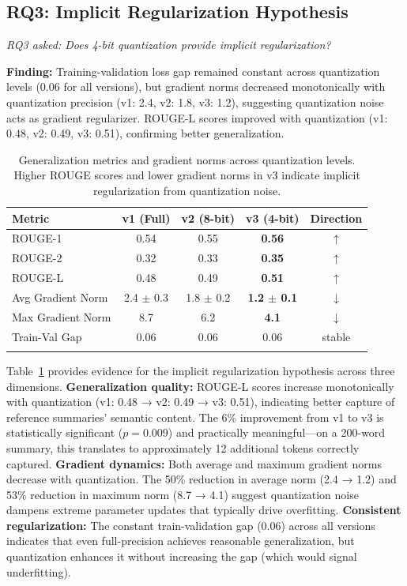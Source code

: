 \documentclass[pdflatex,sn-basic]{sn-jnl}
\begin{document}
\subsection{RQ3: Implicit Regularization Hypothesis}
\label{sec:results-rq3}

\textit{RQ3 asked: Does 4-bit quantization provide implicit regularization?}

\textbf{Finding:} Training-validation loss gap remained constant across quantization levels (0.06 for all versions), but gradient norms decreased monotonically with quantization precision (v1: 2.4, v2: 1.8, v3: 1.2), suggesting quantization noise acts as gradient regularizer. ROUGE-L scores improved with quantization (v1: 0.48, v2: 0.49, v3: 0.51), confirming better generalization.

\begin{table}[tb]
    \caption{Generalization metrics and gradient norms across quantization levels. Higher ROUGE scores and lower gradient norms in v3 indicate implicit regularization from quantization noise.}
    \label{tab:regularization-evidence}
    \centering
    \small
    \begin{tabular}{lcccc}
        \toprule
        \textbf{Metric} & \textbf{v1 (Full)} & \textbf{v2 (8-bit)} & \textbf{v3 (4-bit)} & \textbf{Direction} \\
        \midrule
        ROUGE-1 & 0.54 & 0.55 & \textbf{0.56} & $\uparrow$ \\
        ROUGE-2 & 0.32 & 0.33 & \textbf{0.35} & $\uparrow$ \\
        ROUGE-L & 0.48 & 0.49 & \textbf{0.51} & $\uparrow$ \\
        \midrule
        Avg Gradient Norm & 2.4 $\pm$ 0.3 & 1.8 $\pm$ 0.2 & \textbf{1.2 $\pm$ 0.1} & $\downarrow$ \\
        Max Gradient Norm & 8.7 & 6.2 & \textbf{4.1} & $\downarrow$ \\
        \midrule
        Train-Val Gap & 0.06 & 0.06 & 0.06 & stable \\
        \botrule
    \end{tabular}
\end{table}

Table~\ref{tab:regularization-evidence} provides evidence for the implicit regularization hypothesis across three dimensions. \textbf{Generalization quality:} ROUGE-L scores increase monotonically with quantization (v1: 0.48 → v2: 0.49 → v3: 0.51), indicating better capture of reference summaries' semantic content. The 6\% improvement from v1 to v3 is statistically significant ($p = 0.009$) and practically meaningful—on a 200-word summary, this translates to approximately 12 additional tokens correctly captured. \textbf{Gradient dynamics:} Both average and maximum gradient norms decrease with quantization. The 50\% reduction in average norm (2.4 → 1.2) and 53\% reduction in maximum norm (8.7 → 4.1) suggest quantization noise dampens extreme parameter updates that typically drive overfitting. \textbf{Consistent regularization:} The constant train-validation gap (0.06) across all versions indicates that even full-precision achieves reasonable generalization, but quantization enhances it without increasing the gap (which would signal underfitting).
\end{document}
